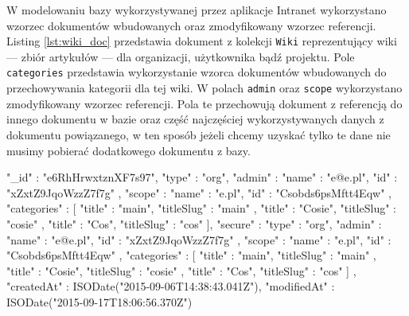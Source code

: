 W modelowaniu bazy wykorzystywanej przez aplikacje Intranet wykorzystano wzorzec dokumentów wbudowanych oraz zmodyfikowany wzorzec referencji. Listing \ref{lst:wiki_doc} przedstawia dokument z kolekcji \verb|Wiki| reprezentujący wiki --- zbiór artykułów --- dla organizacji, użytkownika bądź projektu. 
Pole \verb|categories| przedstawia wykorzystanie wzorca dokumentów wbudowanych do przechowywania kategorii dla tej wiki. W polach \verb|admin| oraz \verb|scope| wykorzystano zmodyfikowany wzorzec referencji. Pola te przechowują dokument z referencją do innego dokumentu w bazie oraz część najczęściej wykorzystywanych danych z dokumentu powiązanego, w ten sposób jeżeli chcemy uzyskać tylko te dane nie musimy pobierać dodatkowego dokumentu z bazy.
\begin{js}[caption={{Przykładowy dokument z kolekcji \textit{Wiki}}},label={lst:wiki_doc}]
{
        "_id" : "e6RhHrwxtznXF7s97",
        "type" : "org",
        "admin" : {
                "name" : "e@e.pl",
                "id" : "xZxtZ9JqoWzzZ7f7g"
        },
        "scope" : {
                "name" : "e.pl",
                "id" : "Csobds6psMftt4Eqw"
        },
        "categories" : [
                {
                        "title" : "main",
                        "titleSlug" : "main"
                },
                {
                        "title" : "Cosie",
                        "titleSlug" : "cosie"
                },
                {
                        "title" : "Cos",
                        "titleSlug" : "cos"
                }
        ],
        "secure" : {
                "type" : "org",
                "admin" : {
                        "name" : "e@e.pl",
                        "id" : "xZxtZ9JqoWzzZ7f7g"
                },
                "scope" : {
                        "name" : "e.pl",
                        "id" : "Csobds6psMftt4Eqw"
                },
                "categories" : [
                        {
                                "title" : "main",
                                "titleSlug" : "main"
                        },
                        {
                                "title" : "Cosie",
                                "titleSlug" : "cosie"
                        },
                        {
                                "title" : "Cos",
                                "titleSlug" : "cos"
                        }
                ]
        },
        "createdAt" : ISODate("2015-09-06T14:38:43.041Z"),
        "modifiedAt" : ISODate("2015-09-17T18:06:56.370Z")
}


\end{js}


